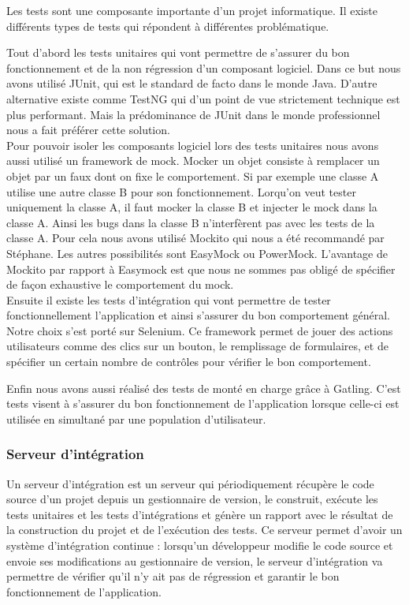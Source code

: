Les tests sont une composante importante d'un projet informatique. Il existe différents types de tests qui répondent à différentes problématique.

Tout d'abord les tests unitaires qui vont permettre de s'assurer du bon fonctionnement et de la non régression d'un composant logiciel. Dans ce but nous avons utilisé JUnit, qui est le standard de facto dans le monde Java. D'autre alternative existe comme TestNG qui d'un point de vue strictement technique est plus performant. Mais la prédominance de JUnit dans le monde professionnel nous a fait préférer cette solution.\\

Pour pouvoir isoler les composants logiciel lors des tests unitaires nous avons aussi utilisé un framework de mock. Mocker un objet consiste à remplacer un objet par un faux dont on fixe le comportement. Si par exemple une classe A utilise une autre classe B pour son fonctionnement. Lorqu'on veut tester uniquement la classe A, il faut mocker la classe B et injecter le mock dans la classe A. Ainsi les bugs dans la classe B n'interfèrent pas avec les tests de la classe A. Pour cela nous avons utilisé Mockito qui nous a été recommandé par Stéphane. Les autres possibilités sont EasyMock ou PowerMock. L'avantage de Mockito par rapport à Easymock est que nous ne sommes pas obligé de spécifier de façon exhaustive le comportement du mock.\\

Ensuite il existe les tests d'intégration qui vont permettre de tester fonctionnellement l'application et ainsi s'assurer du bon comportement général. Notre choix s'est porté sur Selenium. Ce framework permet de jouer des actions utilisateurs comme des clics sur un bouton, le remplissage de formulaires, et de spécifier un certain nombre de contrôles pour vérifier le bon comportement.

Enfin nous avons aussi réalisé des tests de monté en charge grâce à Gatling. C'est tests visent à s'assurer du bon fonctionnement de l'application lorsque celle-ci est utilisée en simultané par une population d'utilisateur.

\subsubsection{Serveur d'intégration}

Un serveur d'intégration est un serveur qui périodiquement récupère le code source d'un projet depuis un gestionnaire de version, le construit, exécute les tests unitaires et les tests d'intégrations et génère un rapport avec le résultat de la construction du projet et de l'exécution des tests. Ce serveur permet d'avoir un système d'intégration continue : lorsqu'un développeur modifie le code source et envoie ses modifications au gestionnaire de version, le serveur d'intégration va permettre de vérifier qu'il n'y ait pas de régression et garantir le bon fonctionnement de l'application.\\

